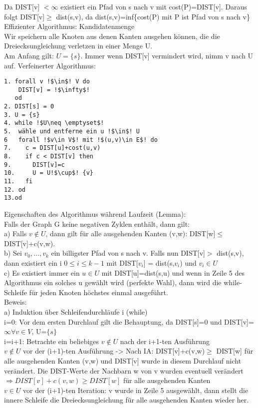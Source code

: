\documentclass[a4paper]{article}
\newcommand{\pl}{\hspace*{1cm}}
\begin{document}
Da DIST[v] $<\infty$ existiert ein Pfad von s nach v mit cost(P)=DIST[v]. Daraus folgt DIST[v]$\geq$ dist(s,v), da dist(s,v)=inf\{cost(P) mit P ist Pfad von s nach v\}\\
Effizienter Algorithmus: Kandidatenmenge\\
Wir speichern alle Knoten aus denen Kanten ausgehen können, die die Dreiecksungleichung verletzen in einer Menge U.\\
Am Anfang gilt: $U=\{s\}$. Immer wenn DIST[v] vermindert wird, nimm v nach U auf.
Verfeinerter Algorithmus:
\begin{lstlisting}[escapechar=!]
1. forall v !$\in$! V do
	DIST[v] = !$\infty$!
   od
2. DIST[s] = 0
3. U = {s}
4. while !$U\neq \emptyset$!
5. 	wähle und entferne ein u !$\in$! U
6	forall !$v\in V$! mit !$(u,v)\in E$! do
7.	  c = DIST[u]+cost(u,v)
8.	  if c < DIST[v] then
9.	  	DIST[v]=c
10.		U = U!$\cup$! {v}
11.	  fi
12.	od
13.od
\end{lstlisting}
Eigenschaften des Algorithmus während Laufzeit (Lemma):\\
Falls der Graph G keine negativen Zyklen enthält, dann gilt: \\
a) Falls $v\not\in U$, dann gilt für alle ausgehenden Kanten (v,w): DIST[w]$\leq$ DIST[v]+c(v,w).\\
b) Sei $v_0,...,v_k$ ein billigster Pfad von s nach v. Falls nun DIST[v]$>$ dist(s,v), dann existiert ein i $0\leq i \leq k-1$ mit DIST[$v_i$] = dist(s,$v_i$) und $v_i\in U$\\
c) Es existiert immer ein $u\in U$ mit DIST[u]=dist(s,u) und wenn in Zeile 5 des Algorithmus ein solches u gewählt wird (perfekte Wahl), dann wird die while-Schleife für jeden Knoten höchstes einmal ausgeführt.\\
Beweis: \\
a) Induktion über Schleifendurchläufe i (while)\\
i=0: Vor dem ersten Durchlauf gilt die Behauptung, da DIST[s]=0 und DIST[v]=$\infty\forall v\in V$, U=$\{s\}$\\
i=i+1: Betrachte ein beliebiges $v\not\in U$ nach der i+1-ten Ausführung\\
\pl $v\not\in U$ vor der (i+1)-ten Ausführung -> Nach IA: DIST[v]+c(v,w)$\geq$ DIST[w] für alle ausgehenden Kanten (v,w) und DIST[v] wurde in diesem Durchlauf nicht verändert. Die  DIST-Werte der Nachbarn w von v wurden eventuell verändert $\Rightarrow DIST[v]+c(v,w) \geq DIST[w]$ für alle ausgehenden Kanten \\
\pl $v\in U$ vor der (i+1)-ten Iteration: v wurde in Zeile 5 ausgewählt, dann stellt die innere Schleife die Dreiecksungleichung für alle ausgehenden Kanten wieder her.\\
\end{document}
